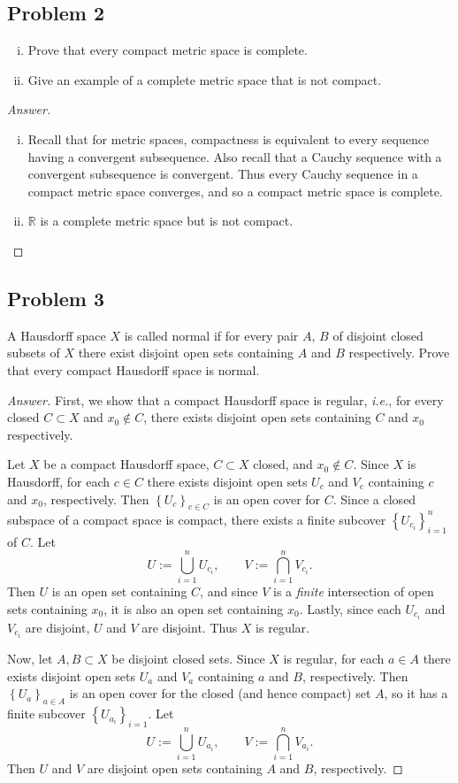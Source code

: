 \documentclass[12pt]{article}
\newcommand{\real}{\mathbb{R}}
\newcommand{\ita}[1]{\textit{#1}}
\newcommand\setb[1]{\left \{ #1 \right \}}
\theoremstyle{definition}
\begin{document}
\subsection{Problem 2}
\begin{enumerate}[(i)]
    \item Prove that every compact metric space is complete.
    \item Give an example of a complete metric space that is not compact.
\end{enumerate}
\begin{proof}[Answer]
    \noindent
    \begin{enumerate}[(i)]
        \item Recall that for metric spaces, compactness is equivalent to every sequence having a convergent subsequence. Also recall that a Cauchy sequence with a convergent subsequence is convergent. Thus every Cauchy sequence in a compact metric space converges, and so a compact metric space is complete.
        \item $\real$ is a complete metric space but is not compact.
    \end{enumerate}
\end{proof}
\subsection{Problem 3}
A Hausdorff space $X$ is called normal if for every pair $A$, $B$ of disjoint closed subsets of $X$ there exist disjoint open sets containing $A$ and $B$ respectively. Prove that every compact Hausdorff space is normal.
\begin{proof}[Answer]
    First, we show that a compact Hausdorff space is regular, \ita{i.e.}, for every closed $C \subset X$ and $x_0 \notin C$, there exists disjoint open sets containing $C$ and $x_0$ respectively.
    
    Let $X$ be a compact Hausdorff space, $C \subset X$ closed, and $x_0 \notin C$. Since $X$ is Hausdorff, for each $c \in C$ there exists disjoint open sets $U_c$ and $V_c$ containing $c$ and $x_0$, respectively. Then $\setb{ U_c }_{c \in C}$ is an open cover for $C$. Since a closed subspace of a compact space is compact, there exists a finite subcover $\setb{ U_{c_i} }_{i = 1}^n$ of $C$. Let
    \[
        U := \bigcup\limits_{i = 1}^n U_{c_i} , \qquad V := \bigcap\limits_{i = 1}^n V_{c_i}.
    \]
    Then $U$ is an open set containing $C$, and since $V$ is a \ita{finite} intersection of open sets containing $x_0$, it is also an open set containing $x_0$. Lastly, since each $U_{c_i}$ and $V_{c_i}$ are disjoint, $U$ and $V$ are disjoint. Thus $X$ is regular.
    
    Now, let $A , B \subset X$ be disjoint closed sets. Since $X$ is regular, for each $a \in A$ there exists disjoint open sets $U_a$ and $V_a$ containing $a$ and $B$, respectively. Then $\setb{ U_a }_{a \in A}$ is an open cover for the closed (and hence compact) set $A$, so it has a finite subcover $\setb{ U_{a_i} }_{i = 1}$. Let 
    \[
        U := \bigcup\limits_{i = 1}^n U_{a_i} , \qquad V := \bigcap\limits_{i = 1}^n V_{a_i}.
    \]
    Then $U$ and $V$ are disjoint open sets containing $A$ and $B$, respectively.
\end{proof}
\end{document}
